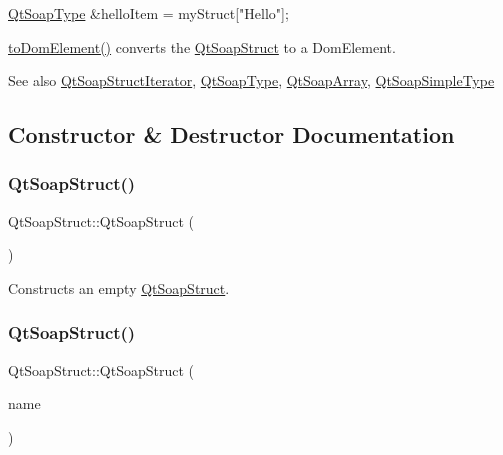 \begin{DoxyCode}
\mbox{\hyperlink{class_qt_soap_type}{QtSoapType}} &helloItem = myStruct[\textcolor{stringliteral}{"Hello"}];
\end{DoxyCode}


\mbox{\hyperlink{class_qt_soap_struct_a3a57e002d42e8d048b0c0bf9678ff2f9}{to\+Dom\+Element()}} converts the \mbox{\hyperlink{class_qt_soap_struct}{Qt\+Soap\+Struct}} to a Dom\+Element.

\begin{DoxySeeAlso}{See also}
\mbox{\hyperlink{class_qt_soap_struct_iterator}{Qt\+Soap\+Struct\+Iterator}}, \mbox{\hyperlink{class_qt_soap_type}{Qt\+Soap\+Type}}, \mbox{\hyperlink{class_qt_soap_array}{Qt\+Soap\+Array}}, \mbox{\hyperlink{class_qt_soap_simple_type}{Qt\+Soap\+Simple\+Type}} 
\end{DoxySeeAlso}


\subsection{Constructor \& Destructor Documentation}
\mbox{\label{class_qt_soap_struct_a74de7963ddb745a2f3e179a1f1b90bbb}} 
\subsubsection{\texorpdfstring{Qt\+Soap\+Struct()}{QtSoapStruct()}\hspace{0.1cm}{\footnotesize\ttfamily [1/3]}}
{\footnotesize\ttfamily Qt\+Soap\+Struct\+::\+Qt\+Soap\+Struct (\begin{DoxyParamCaption}{ }\end{DoxyParamCaption})}

Constructs an empty \mbox{\hyperlink{class_qt_soap_struct}{Qt\+Soap\+Struct}}. \mbox{\label{class_qt_soap_struct_a70a767d39cf91f23936fb86ce4ec336c}} 
\subsubsection{\texorpdfstring{Qt\+Soap\+Struct()}{QtSoapStruct()}\hspace{0.1cm}{\footnotesize\ttfamily [2/3]}}
{\footnotesize\ttfamily Qt\+Soap\+Struct\+::\+Qt\+Soap\+Struct (\begin{DoxyParamCaption}\item[{const \mbox{\hyperlink{class_qt_soap_q_name}{Qt\+Soap\+Q\+Name}} \&}]{name }\end{DoxyParamCaption})}

